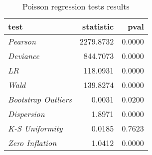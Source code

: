 \begin{wraptable}{r}{2.5in}

\caption{\label{tab:poisson_reg_tests}Poisson regression tests results}
\centering
\fontsize{9}{11}\selectfont
\begin{tabular}[t]{>{}lrr}
\toprule
test & statistic & pval\\
\midrule
\em{Pearson} & 2279.8732 & 0.0000\\
\em{Deviance} & 844.7073 & 0.0000\\
\em{LR} & 118.0931 & 0.0000\\
\em{Wald} & 139.8274 & 0.0000\\
\em{Bootstrap Outliers} & 0.0031 & 0.0200\\
\addlinespace
\em{Dispersion} & 1.8971 & 0.0000\\
\em{K-S Uniformity} & 0.0185 & 0.7623\\
\em{Zero Inflation} & 1.0412 & 0.0000\\
\bottomrule
\end{tabular}
\end{wraptable}
